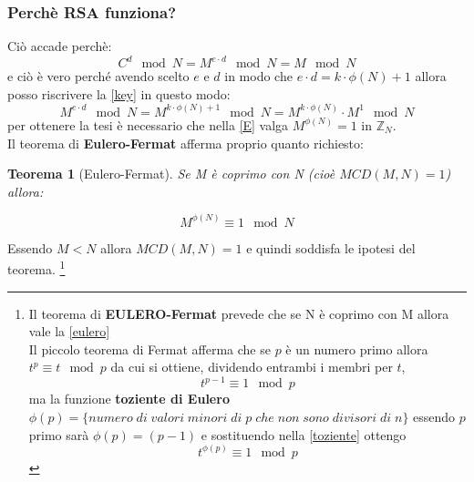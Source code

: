 \documentclass[14pt,a4paper]{article}
\newtheorem{theorem}{Teorema}[section]
\begin{document}
	\subsubsection{Perchè RSA funziona?}
	Ciò accade perchè:
	\begin{equation}\label{key}
		C^d \mod N = M^{e\cdot d} \mod N=M \mod N
	\end{equation}
	e ciò è vero perché avendo scelto $ e $ e $ d $ in modo che $ e\cdot d=k\cdot \phi(N)+1 $ allora posso riscrivere la \eqref{key} in questo modo:
	\begin{equation}\label{E}
		M^{e\cdot d} \mod N=M^{k\cdot \phi(N)+1} \mod N=M^{k\cdot \phi(N)}\cdot M^1 \mod N
	\end{equation}
	per ottenere la tesi è necessario che nella  \eqref{E} valga $ M^{ \phi(N)}=1 $ in $ \mathbb{Z}_N $.
	\\Il teorema di \textbf{Eulero-Fermat} afferma proprio quanto richiesto:\\
	\begin{theorem}[Eulero-Fermat]
		Se M è coprimo con N (cioè $ MCD(M,N)=1 $) allora:
	
		
	\begin{equation}\label{eulero}
		\boxed{M^{\phi(N)} \equiv 1 \mod N}
	\end{equation}
\end{theorem}
	Essendo $ M<N $ allora $ MCD(M,N)=1 $ e quindi soddisfa le ipotesi del teorema.
	\footnote{Il teorema di \textbf{EULERO-Fermat} prevede che se N è coprimo con M allora vale la \ref{eulero} \\Il piccolo teorema di Fermat afferma che se $ p $ è un numero primo allora $ t^p \equiv t  \mod p $ da cui si ottiene, dividendo entrambi i membri per $ t $,  \begin{equation}
			t^{p-1}\equiv 1 \mod p \label{toziente}
		\end{equation} ma la funzione \textbf{toziente di Eulero} $ \phi(p)=\{numero\;di\;valori\;minori\;di\;p\;che\;non\;sono\;divisori\;di\;n\} $  essendo $ p  $  primo sarà $ \phi(p)=(p-1) $ e sostituendo nella \eqref{toziente} ottengo \begin{equation}
			t^{\phi(p)} \equiv 1 \mod p
	\end{equation}}
\end{document}
